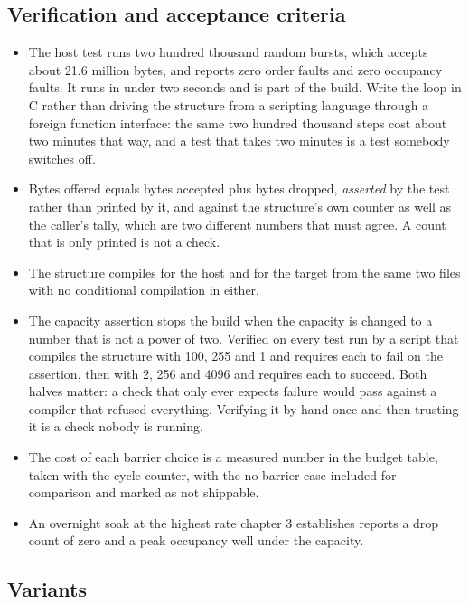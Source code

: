 \subsection*{Verification and acceptance criteria}

\begin{itemize}
\item The host test runs two hundred thousand random bursts, which accepts about
21.6 million bytes, and reports zero order faults and zero occupancy faults. It
runs in under two seconds and is part of the build. Write the loop in C rather
than driving the structure from a scripting language through a foreign function
interface: the same two hundred thousand steps cost about two minutes that way,
and a test that takes two minutes is a test somebody switches off.
\item Bytes offered equals bytes accepted plus bytes dropped, \emph{asserted} by
the test rather than printed by it, and against the structure's own counter as
well as the caller's tally, which are two different numbers that must agree. A
count that is only printed is not a check.
\item The structure compiles for the host and for the target from the same two
files with no conditional compilation in either.
\item The capacity assertion stops the build when the capacity is changed to a
number that is not a power of two. Verified on every test run by a script that
compiles the structure with 100, 255 and 1 and requires each to fail on the
assertion, then with 2, 256 and 4096 and requires each to succeed. Both halves
matter: a check that only ever expects failure would pass against a compiler
that refused everything. Verifying it by hand once and then trusting it is a
check nobody is running.
\item The cost of each barrier choice is a measured number in the budget table,
taken with the cycle counter, with the no-barrier case included for comparison
and marked as not shippable.
\item An overnight soak at the highest rate chapter 3 establishes reports a drop
count of zero and a peak occupancy well under the capacity.
\end{itemize}

\subsection*{Variants}

